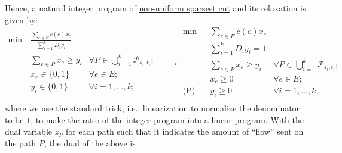 Hence, a natural integer program of \hyperref[prb:non-uniform-sparsest-cut]{non-uniform sparsest cut} and its relaxation is given by:
\begin{equation}\label{eq:non-uniform-sparsest-cut-LP-primal}
	\begin{aligned}
		\min~ & \frac{\sum_{e \in E} c(e) x_e}{\sum_{i=1}^{k} D_i y_i}                                                            \\
		      & \sum_{e \in P} x_e \geq y_i                            & \forall P \in \bigcup_{i=1}^{k} \mathcal{P} _{s_i, t_i}; \\
		      & x_e \in \{ 0, 1 \}                                     & \forall e \in E;                                         \\
		      & y_i \in \{ 0, 1 \}                                     & \forall i = 1, \dots , k;                                \\
	\end{aligned}\quad
	\to
	\begin{aligned}
		\min~           & \sum_{e \in E} c(e) x_e                                                                \\
		                & \sum_{i=1}^{k} D_i y_i = 1                                                             \\
		                & \sum_{e \in P} x_e \geq y_i & \forall P \in \bigcup_{i=1}^{k} \mathcal{P} _{s_i, t_i}; \\
		                & x_e \geq 0                  & \forall e \in E ;                                        \\
		\text{(P)}\quad & y_i \geq 0                  & \forall i = 1, \dots , k,                                \\
	\end{aligned}
\end{equation}
where we use the standard trick, i.e., linearization to normalize the denominator to be \(1\), to make the ratio of the integer program into a linear program. With the dual variable \(z_P\) for each path such that it indicates the amount of ``flow'' sent on the path \(P\), the dual of the above is

